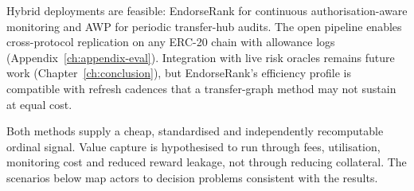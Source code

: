 
Hybrid deployments are feasible: EndorseRank for continuous authorisation-aware monitoring and AWP for periodic transfer-hub audits. The open pipeline enables cross-protocol replication on any ERC-20 chain with allowance logs (Appendix~\ref{ch:appendix-eval}). Integration with live risk oracles remains future work (Chapter~\ref{ch:conclusion}), but EndorseRank's efficiency profile is compatible with refresh cadences that a transfer-graph method may not sustain at equal cost.


Both methods supply a cheap, standardised and independently recomputable ordinal signal. Value capture is hypothesised to run through fees, utilisation, monitoring cost and reduced reward leakage, not through reducing collateral. The scenarios below map actors to decision problems consistent with the results.

